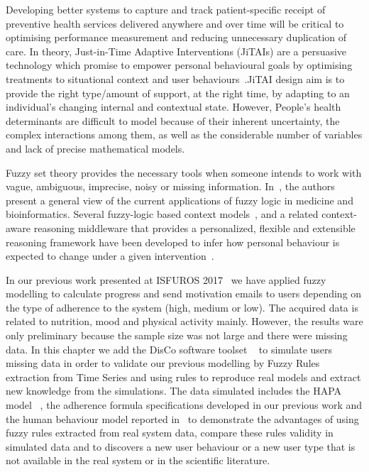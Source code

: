\documentclass{llncs}
\begin{document}
Developing better systems to capture and track patient-specific receipt of preventive health services delivered anywhere and over time will be critical to optimising performance measurement and reducing unnecessary duplication of care\cite{Bowen2017}. In theory, Just-in-Time Adaptive Interventions (JiTAIs)\cite{Nahum-Shani} are a persuasive technology which promise to empower personal behavioural goals by optimising treatments to situational context and user behaviours~\cite{Murray2016}.JiTAI design aim is to provide the right type/amount of support, at the right time, by adapting to an individual's changing internal and contextual state\cite{Nahum-Shani}. However, People's health determinants are difficult to model because of their inherent uncertainty, the complex interactions among them, as well as the considerable number of variables and lack of precise mathematical models\cite{Hekler2016}. 

Fuzzy set theory provides the necessary tools when someone intends to work with vague, ambiguous, imprecise, noisy or missing information\cite{Gursel2016, Bingchuan2012, Giabbanelli2014, Giabbanelli2006}. In~\cite{Giabbanelli2006}, the authors present a general view of the current applications of fuzzy logic in medicine and bioinformatics. Several fuzzy-logic based context models~\cite{Bingchuan2012}, and a related context-aware reasoning middleware that provides a personalized, flexible and extensible reasoning framework have been developed to infer how personal behaviour is expected to change under a given intervention~\cite{Giabbanelli2014}. 


In our previous work  presented at ISFUROS 2017~\cite{rem2017} we have applied fuzzy modelling to calculate progress and send motivation emails to users depending on the type of adherence to the system (high, medium or low). The acquired data is related to nutrition, mood and physical activity mainly. However, the results ware only preliminary because the sample size was not large and there were missing data. In this chapter we add the DisCo software toolset ~\cite{Disco} to simulate users missing data in order to validate our previous modelling by Fuzzy Rules extraction from Time Series and using rules to reproduce real models and extract new knowledge from the simulations. 
The data simulated includes the HAPA model ~\cite{MacPhail}, the adherence formula specifications developed in our previous work and the human behaviour model reported in~\cite{Brailsford2016}
to demonstrate the advantages of using fuzzy rules extracted from real system data, compare these rules validity in simulated data  and to discovers a new user behaviour or a new user type that is not available in the real system or in the scientific literature.
\end{document}
